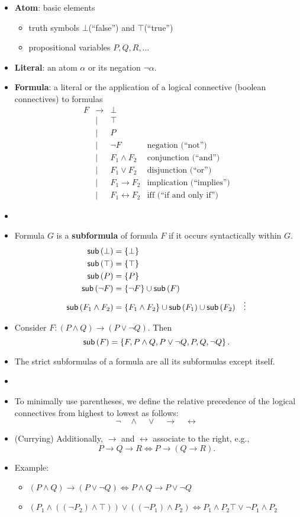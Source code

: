 \begin{itemize}
	\item \textbf{Atom}: basic elements
	\begin{itemize}
		\item truth symbols $\bot$(``false'') and $\top$(``true'')
		\item propositional variables $P,Q,R,\dots$
	\end{itemize}
	\item \textbf{Literal}: an atom $\alpha$ or its negation $\lnot\alpha$.
	\item \textbf{Formula}: a literal or the application of a logical connective (boolean connectives) to formulas
	\[
	\begin{array}{ccll}
		F & \to & \bot \\
		& | & \top \\
		& | & P \\
		& | & \lnot F & \text{negation (``not'')} \\
		& | & F_1\land F_2 & \text{conjunction (``and'')} \\
		& | & F_1\lor F_2 & \text{disjunction (``or'')} \\
		& | & F_1\to F_2 & \text{implication (``implies'')} \\
		& | & F_1\leftrightarrow F_2 & \text{iff (``if and only if'')}
	\end{array}
	\]
	\item[]
	\item Formula $G$ is a \textbf{subformula} of formula $F$ if it occurs syntactically within $G$.
	\begin{align*}
		\textsf{sub}\left(\bot\right) &= \set{\bot} \\
		\textsf{sub}\left(\top\right) &= \set{\top} \\
		\textsf{sub}\left(P\right) &= \set{P} \\
		\textsf{sub}\left(\lnot F\right) &= \set{\lnot F}\cup\textsf{sub}\left(F\right) \\
		\textsf{sub}\left(F_1\land F_2\right) &= \set{F_1\land F_2}\cup\textsf{sub}\left(F_1\right)\cup\textsf{sub}\left(F_2\right)
		&\vdots
	\end{align*}
	\item Consider $F:(P\land Q)\to (P\lor\lnot Q)$. Then \[
	\textsf{sub}\left(F\right)=\set{F,P\land Q,P\lor\lnot Q,P,Q,\lnot Q}.
	\]
	
	\item The strict subformulas of a formula are all its subformulas except itself.
	\item[]
	\item To minimally use parentheses, we define the relative precedence of the logical connectives from highest to lowest as follows: \[
	\lnot\quad\land\quad\lor\quad\rightarrow\quad\leftrightarrow
	\]
	\item (Currying) Additionally, $\rightarrow$ and $\leftrightarrow$ associate to the right, e.g., \[
	P\to Q\to R\iff P\to(Q\to R).
	\]
	\item Example:
	\begin{itemize}
		\item $(P\land Q)\to (P\lor\lnot Q)\iff P\land Q\to P\lor \lnot Q$
		\item $(P_1\land((\lnot P_2)\land\top))\lor((\lnot P_1)\land P_2)\iff P_1\land P_2\top\lor\lnot P_1\land P_2$
	\end{itemize}
\end{itemize}

